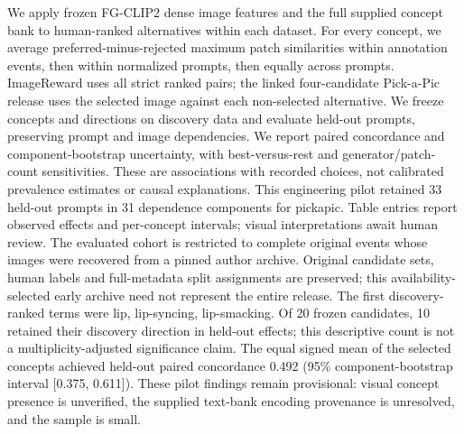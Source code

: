We apply frozen FG-CLIP2 dense image features and the full supplied concept bank to human-ranked alternatives within each dataset. For every concept, we average preferred-minus-rejected maximum patch similarities within annotation events, then within normalized prompts, then equally across prompts. ImageReward uses all strict ranked pairs; the linked four-candidate Pick-a-Pic release uses the selected image against each non-selected alternative. We freeze concepts and directions on discovery data and evaluate held-out prompts, preserving prompt and image dependencies. We report paired concordance and component-bootstrap uncertainty, with best-versus-rest and generator/patch-count sensitivities. These are associations with recorded choices, not calibrated prevalence estimates or causal explanations. This engineering pilot retained 33 held-out prompts in 31 dependence components for pickapic. Table entries report observed effects and per-concept intervals; visual interpretations await human review.
The evaluated cohort is restricted to complete original events whose images were recovered from a pinned author archive. Original candidate sets, human labels and full-metadata split assignments are preserved; this availability-selected early archive need not represent the entire release.
The first discovery-ranked terms were lip, lip-syncing, lip-smacking. Of 20 frozen candidates, 10 retained their discovery direction in held-out effects; this descriptive count is not a multiplicity-adjusted significance claim. The equal signed mean of the selected concepts achieved held-out paired concordance 0.492 (95\% component-bootstrap interval [0.375, 0.611]). These pilot findings remain provisional: visual concept presence is unverified, the supplied text-bank encoding provenance is unresolved, and the sample is small.
